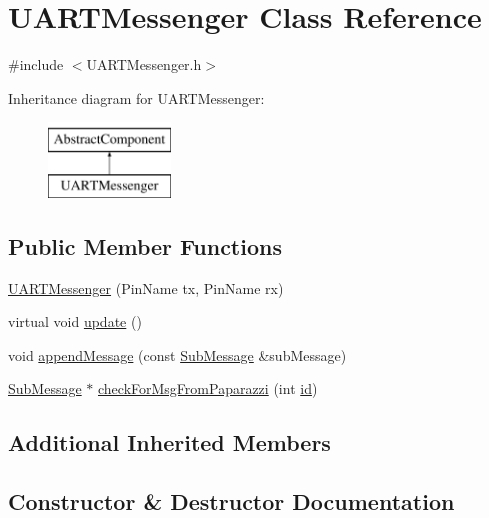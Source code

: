 \hypertarget{class_u_a_r_t_messenger}{}\section{U\+A\+R\+T\+Messenger Class Reference}
\label{class_u_a_r_t_messenger}


{\ttfamily \#include $<$U\+A\+R\+T\+Messenger.\+h$>$}

Inheritance diagram for U\+A\+R\+T\+Messenger\+:\begin{figure}[H]
\begin{center}
\leavevmode
\includegraphics[height=2.000000cm]{class_u_a_r_t_messenger}
\end{center}
\end{figure}
\subsection*{Public Member Functions}
\begin{DoxyCompactItemize}
\item 
\hyperlink{class_u_a_r_t_messenger_a2fcc2d4308e961996cf3dd120f297112}{U\+A\+R\+T\+Messenger} (Pin\+Name tx, Pin\+Name rx)
\item 
virtual void \hyperlink{class_u_a_r_t_messenger_a7f2c3bdcf3a2b082e52815b97be37281}{update} ()
\item 
void \hyperlink{class_u_a_r_t_messenger_ada0967869e320c236a211b405abf128a}{append\+Message} (const \hyperlink{struct_sub_message}{Sub\+Message} \&sub\+Message)
\item 
\hyperlink{struct_sub_message}{Sub\+Message} $\ast$ \hyperlink{class_u_a_r_t_messenger_affb33ad31e70001505e14d02e1f8a018}{check\+For\+Msg\+From\+Paparazzi} (int \hyperlink{class_abstract_component_a9c9c548149681b1a1dd935e66ed5dd11}{id})
\end{DoxyCompactItemize}
\subsection*{Additional Inherited Members}


\subsection{Constructor \& Destructor Documentation}
\mbox{\label{class_u_a_r_t_messenger_a2fcc2d4308e961996cf3dd120f297112}} 
